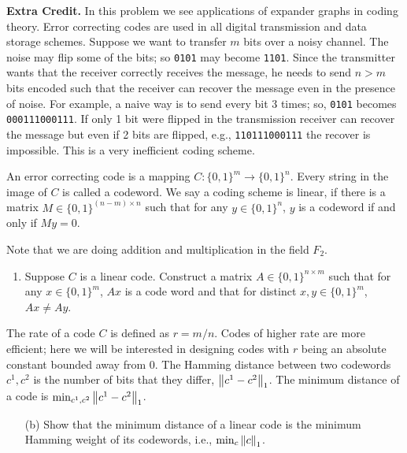 \documentclass[10pt]{article}
\begin{document}
\begin{problem}[Problem 5]
    \textbf{Extra Credit.} 
    In this problem we see applications of expander graphs in coding theory. Error correcting codes are used in all digital transmission and data storage schemes. Suppose we want to transfer \( m \) bits over a noisy channel. The noise may flip some of the bits; so {\tt 0101} may become {\tt 1101}. Since the transmitter wants that the receiver correctly receives the message, he needs to send \( n > m \) bits encoded such that the receiver can recover the message even in the presence of noise. For example, a naive way is to send every bit 3 times; so, {\tt 0101} becomes {\tt 000111000111}. If only 1 bit were flipped in the transmission receiver can recover the message but even if 2 bits are flipped, e.g., {\tt 110111000111} the recover is impossible. This is a very inefficient coding scheme.

    An error correcting code is a mapping \( C : \{0, 1\}^m \to \{0, 1\}^n \). Every string in the image of \( C \) is called a codeword. We say a coding scheme is linear, if there is a matrix \( M \in \{0, 1\}^{(n-m)\times n} \) such that for any \( y \in \{0, 1\}^n \), \( y \) is a codeword if and only if \( My = 0 \). 

    Note that we are doing addition and multiplication in the field \( F_2 \).

    \begin{enumerate}[label=(\alph*),nolistsep]
        \item Suppose \( C \) is a linear code. Construct a matrix \( A \in \{0,1\}^{n\times m} \) such that for any \( x\in \{0,1\}^m \), \( Ax \) is a code word and that for distinct \( x,y\in\{0,1\}^m \), \( Ax \neq Ay \).
    \end{enumerate}
    The rate of a code \( C \) is defined as \( r = m/n \). Codes of higher rate are more efficient; here we will be interested in designing codes with \( r \) being an absolute constant bounded away from 0. The Hamming distance between two codewords \( c^1, c^2 \) is the number of bits that they differ, \( \left\lVert c^1-c^2\right\rVert_1 \). The minimum distance of a code is \( \min_{c^1,c^2} \left\lVert c^1-c^2\right\rVert_1 \).
\begin{enumerate}[label=(\alph*),nolistsep]
    \item[(b)] Show that the minimum distance of a linear code is the minimum Hamming weight of its codewords, i.e., \( \min_c \left\lVert c\right\rVert_1 \).
\end{enumerate}


\end{problem}
\end{document}
